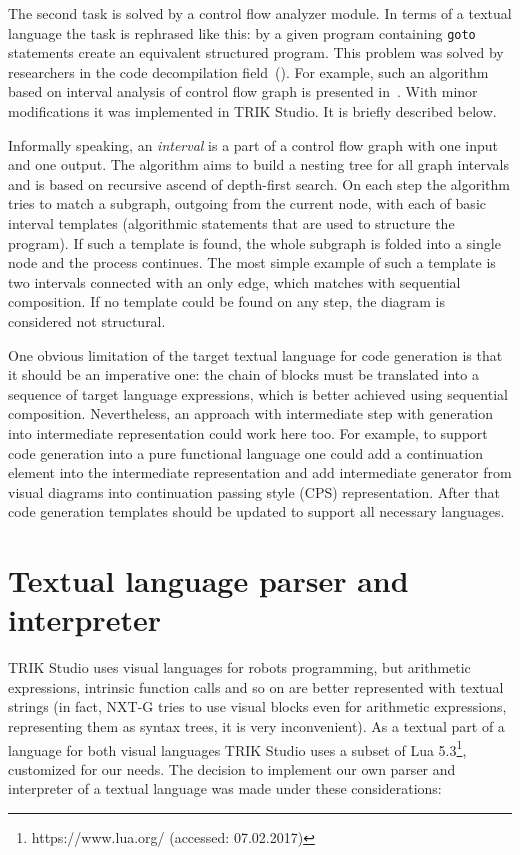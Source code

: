 \documentclass[conference]{IEEEtran}
\begin{document}
The second task is solved by a control flow analyzer module. In terms of a textual language the task is rephrased like this: by a given program containing \texttt{goto} statements create an equivalent structured program. This problem was solved by researchers in the code decompilation field~(\cite{steven1997advanced,деревенец2009структурный}). For example, such an algorithm based on interval analysis of control flow graph is presented in~\cite{steven1997advanced}. With minor modifications it was implemented in TRIK Studio. It is briefly described below.

Informally speaking, an \textit{interval} is a part of a control flow graph with one input and one output. The algorithm aims to build a nesting tree for all graph intervals and is based on recursive ascend of depth-first search. On each step the algorithm tries to match a subgraph, outgoing from the current node, with each of basic interval templates (algorithmic statements that are used to structure the program). If such a template is found, the whole subgraph is folded into a single node and the process continues. The most simple example of such a template is two intervals connected with an only edge, which matches with sequential composition. If no template could be found on any step, the diagram is considered not structural. 

One obvious limitation of the target textual language for code generation is that it should be an imperative one: the chain of blocks must be translated into a sequence of target language expressions, which is better achieved using sequential composition. Nevertheless, an approach with intermediate step with generation into intermediate representation could work here too. For example, to support code generation into a pure functional language one could add a continuation element into the intermediate representation and add intermediate generator from visual diagrams into continuation passing style (CPS) representation. After that code generation templates should be updated to support all necessary languages.
 
\section{Textual language parser and interpreter}
\label{chapter:parser}
TRIK Studio uses visual languages for robots programming, but arithmetic expressions, intrinsic function calls and so on are better represented with textual strings (in fact, NXT-G tries to use visual blocks even for arithmetic expressions, representing them as syntax trees, it is very inconvenient). As a textual part of a language for both visual languages TRIK Studio uses a subset of Lua 5.3\footnote{https://www.lua.org/ (accessed: 07.02.2017)}, customized for our needs. The decision to implement our own parser and interpreter of a textual language was made under these considerations:
\end{document}
